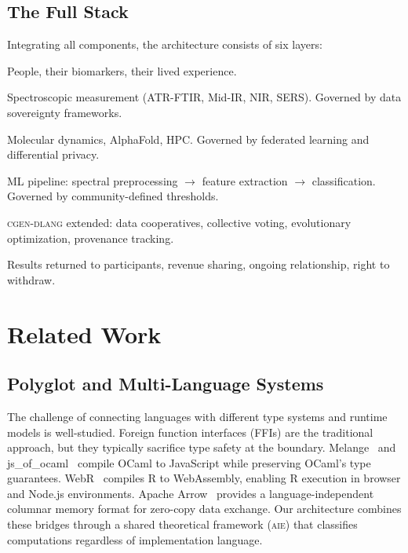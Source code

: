 \documentclass[11pt,letterpaper]{article}
\newcommand{\aie}{\textsc{aie}}
\newcommand{\cgen}{\textsc{cgen-dlang}}
\begin{document}
\subsection{The Full Stack}

Integrating all components, the architecture consists of six layers:

\begin{description}[leftmargin=*,style=nextline]
  \item[Layer 0: Biology] People, their biomarkers, their lived experience.
  \item[Layer 1: Detection] Spectroscopic measurement (ATR-FTIR, Mid-IR, NIR, SERS). Governed by data sovereignty frameworks.
  \item[Layer 2: Computation] Molecular dynamics, AlphaFold, HPC. Governed by federated learning and differential privacy.
  \item[Layer 3: Classification] ML pipeline: spectral preprocessing $\rightarrow$ feature extraction $\rightarrow$ classification. Governed by community-defined thresholds.
  \item[Layer 4: Governance] \cgen{} extended: data cooperatives, collective voting, evolutionary optimization, provenance tracking.
  \item[Layer 5: Outcomes] Results returned to participants, revenue sharing, ongoing relationship, right to withdraw.
\end{description}

\section{Related Work}
\label{sec:related}

\subsection{Polyglot and Multi-Language Systems}

The challenge of connecting languages with different type systems and runtime models is well-studied. Foreign function interfaces (FFIs) are the traditional approach, but they typically sacrifice type safety at the boundary. Melange~\cite{melange2023} and js\_of\_ocaml~\cite{vouillon2014} compile OCaml to JavaScript while preserving OCaml's type guarantees. WebR~\cite{webr2024} compiles R to WebAssembly, enabling R execution in browser and Node.js environments. Apache Arrow~\cite{arrow2022} provides a language-independent columnar memory format for zero-copy data exchange. Our architecture combines these bridges through a shared theoretical framework (\aie{}) that classifies computations regardless of implementation language.
\end{document}
